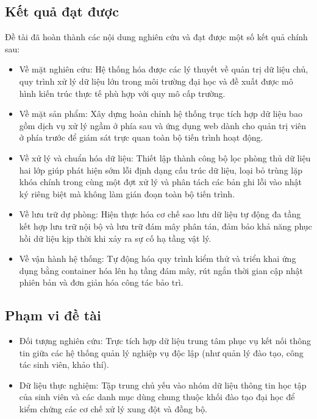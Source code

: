 \subsection{Kết quả đạt được}
Đề tài đã hoàn thành các nội dung nghiên cứu và đạt được một số kết quả chính sau:
\begin{itemize}
  \item Về mặt nghiên cứu: Hệ thống hóa được các lý thuyết về quản trị dữ liệu chủ, quy trình xử lý dữ liệu lớn trong môi trường đại học và đề xuất được mô hình kiến trúc thực tế phù hợp với quy mô cấp trường.
  \item Về mặt sản phẩm: Xây dựng hoàn chỉnh hệ thống trục tích hợp dữ liệu bao gồm dịch vụ xử lý ngầm ở phía sau và ứng dụng web dành cho quản trị viên ở phía trước để giám sát trực quan toàn bộ tiến trình hoạt động.
  \item Về xử lý và chuẩn hóa dữ liệu: Thiết lập thành công bộ lọc phòng thủ dữ liệu hai lớp giúp phát hiện sớm lỗi định dạng cấu trúc dữ liệu, loại bỏ trùng lặp khóa chính trong cùng một đợt xử lý và phân tách các bản ghi lỗi vào nhật ký riêng biệt mà không làm gián đoạn toàn bộ tiến trình.
  \item Về lưu trữ dự phòng: Hiện thực hóa cơ chế sao lưu dữ liệu tự động đa tầng kết hợp lưu trữ nội bộ và lưu trữ đám mây phân tán, đảm bảo khả năng phục hồi dữ liệu kịp thời khi xảy ra sự cố hạ tầng vật lý.
  \item Về vận hành hệ thống: Tự động hóa quy trình kiểm thử và triển khai ứng dụng bằng container hóa lên hạ tầng đám mây, rút ngắn thời gian cập nhật phiên bản và đơn giản hóa công tác bảo trì.
\end{itemize}

\subsection{Phạm vi đề tài}
\begin{itemize}
  \item Đối tượng nghiên cứu: Trực tích hợp dữ liệu trung tâm phục vụ kết nối thông tin giữa các hệ thống quản lý nghiệp vụ độc lập (như quản lý đào tạo, công tác sinh viên, khảo thí).
  \item Dữ liệu thực nghiệm: Tập trung chủ yếu vào nhóm dữ liệu thông tin học tập của sinh viên và các danh mục dùng chung thuộc khối đào tạo đại học để kiểm chứng các cơ chế xử lý xung đột và đồng bộ.
\end{itemize}

